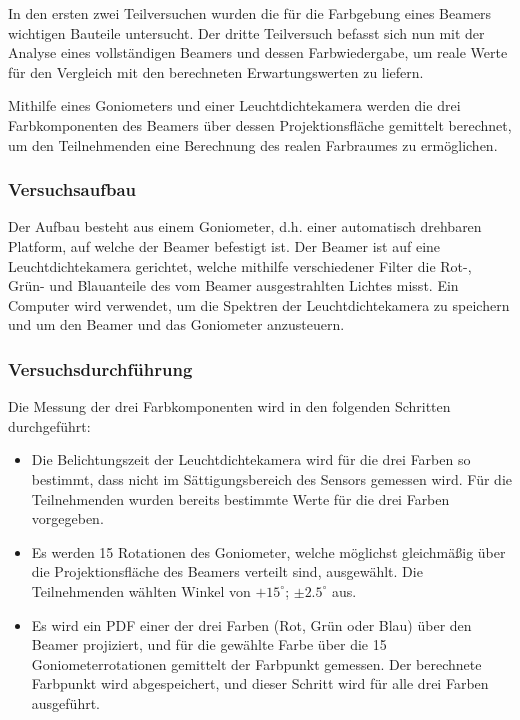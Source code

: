 
In den ersten zwei Teilversuchen wurden die für die Farbgebung eines Beamers wichtigen Bauteile untersucht. Der dritte Teilversuch befasst sich nun mit der Analyse eines vollständigen Beamers und dessen Farbwiedergabe, um reale Werte für den Vergleich mit den berechneten Erwartungswerten zu liefern.

Mithilfe eines Goniometers und einer Leuchtdichtekamera werden die drei Farbkomponenten des Beamers über dessen Projektionsfläche gemittelt berechnet, um den Teilnehmenden eine Berechnung des realen Farbraumes zu ermöglichen.

\subsubsection{Versuchsaufbau}

Der Aufbau besteht aus einem Goniometer, d.h. einer automatisch drehbaren Platform, auf welche der Beamer befestigt ist. Der Beamer ist auf eine Leuchtdichtekamera gerichtet, welche mithilfe verschiedener Filter die Rot-, Grün- und Blauanteile des vom Beamer ausgestrahlten Lichtes misst. Ein Computer wird verwendet, um die Spektren der Leuchtdichtekamera zu speichern und um den Beamer und das Goniometer anzusteuern.

\subsubsection{Versuchsdurchführung}

Die Messung der drei Farbkomponenten wird in den folgenden Schritten durchgeführt:
\begin{itemize}
\item Die Belichtungszeit der Leuchtdichtekamera wird für die drei Farben so bestimmt, dass nicht im Sättigungsbereich des Sensors gemessen wird. Für die Teilnehmenden wurden bereits bestimmte Werte für die drei Farben vorgegeben.
\item Es werden 15 Rotationen des Goniometer, welche möglichst gleichmäßig über die Projektionsfläche des Beamers verteilt sind, ausgewählt. Die Teilnehmenden wählten Winkel von $+15^\circ$; $\pm2.5^\circ$ aus.
\item Es wird ein PDF einer der drei Farben (Rot, Grün oder Blau) über den Beamer projiziert, und für die gewählte Farbe über die 15 Goniometerrotationen gemittelt der Farbpunkt gemessen. Der berechnete Farbpunkt wird abgespeichert, und dieser Schritt wird für alle drei Farben ausgeführt.
\end{itemize}

